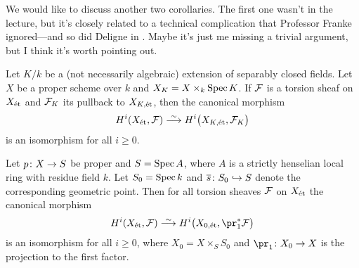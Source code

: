 \documentclass[a4paper, 10pt, oneside, DIV=9, chapterprefix=true, numbers=enddot, bibliography=totoc]{scrbook}
\begin{document}
We would like to discuss another two corollaries. The first one wasn't in the lecture, but it's closely related to a technical complication that Professor Franke ignored---and so did Deligne in \cite[Arcata~IV]{sga4.5}. Maybe it's just me missing a trivial argument, but I think it's worth pointing out.
\begin{cor*}\label{cor*:fuckUp}
	Let $K/k$ be a (not necessarily algebraic) extension of separably closed fields. Let $X$ be a proper scheme over $k$ and $X_K=X\times_k\operatorname{Spec} K$. If $\mathcal{F}$ is a torsion sheaf on $X_{\mathrm{\acute{e}t}}$ and $\mathcal{F}_K$ its pullback to $X_{K,\mathrm{\acute{e}t}}$, then the canonical morphism
	\begin{equation*}
		H^i(X_\et,\Ff)\isomorphism H^i\big(X_{K,\et},\Ff_K\big)
	\end{equation*}
	is an isomorphism for all $i\geq 0$.
\end{cor*} 
\begin{cor}\label{cor:properBaseChange}
	Let $p\colon X\morphism S$ be proper and $S=\operatorname{Spec} A$, where $A$ is a strictly henselian local ring with residue field $k$. Let $S_0= \operatorname{Spec} k$ and $\ov{s}\colon S_0\monomorphism S$ denote the corresponding geometric point. Then for all torsion sheaves $\mathcal{F}$ on $X_{\mathrm{\acute{e}t}}$ the canonical morphism
	\begin{equation*}
		H^i(X_\et,\Ff)\isomorphism H^i\big(X_{0,\et},\pr_1^*\Ff\big)
	\end{equation*}
	is an isomorphism for all $i\geq 0$, where $X_0=X\times_SS_0$ and $\pr_1\colon X_0\morphism X$ is the projection to the first factor.
\end{cor}
\end{document}
